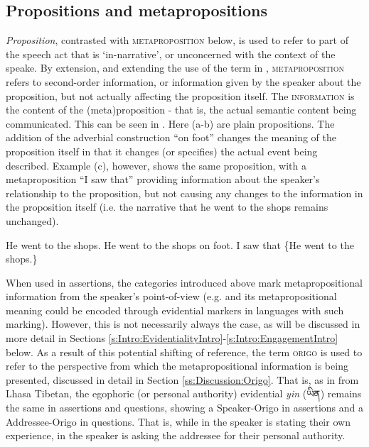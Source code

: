 \subsection{Propositions and metapropositions}
\textit{Proposition}, contrasted with \textsc{metaproposition} below, is used to refer to part of the speech act that is `in-narrative', or unconcerned with the context of the speake. By extension, and extending the use of the term in , \textsc{metaproposition} refers to second-order information, or information given by the speaker about the proposition, but not actually affecting the proposition itself. The \textsc{information} is the content of the (meta)proposition - that is, the actual semantic content being communicated. This can be seen in . Here (a-b) are plain propositions. The addition of the adverbial construction ``on foot'' changes the meaning of the proposition itself in that it changes (or specifies) the actual event being described. Example (c), however, shows the same proposition, with a metaproposition ``I saw that'' providing information about the speaker's relationship to the proposition, but not causing any changes to the information in the proposition itself (i.e. the narrative that he went to the shops remains unchanged).

\begin{exe}
\ex\label{ex:MetapropEnglish}
\begin{xlist}
\ex He went to the shops.
\ex He went to the shops on foot.
\ex I saw that \{He went to the shops.\}\label{ex:MetapropEnglish:c}
\end{xlist}
\end{exe}

When used in assertions, the categories introduced above mark metapropositional information from the speaker's point-of-view (e.g.  and its metapropositional meaning could be encoded through evidential markers in languages with such marking). However, this is not necessarily always the case, as will be discussed in more detail in Sections \ref{s:Intro:EvidentialityIntro}-\ref{s:Intro:EngagementIntro} below. As a result of this potential shifting of reference, the term \textsc{origo} is used to refer to the perspective from which the metapropositional information is being presented, discussed in detail in Section \ref{ss:Discussion:Origo}. That is, as in  from Lhasa Tibetan, the egophoric (or personal authority) evidential \textit{yin} (\foreignlanguage{tibetan}{ཡིན}) remains the same in assertions and questions, showing a Speaker-Origo in assertions and a Addressee-Origo in questions. That is, while in  the speaker is stating their own experience, in  the speaker is asking the addressee for their personal authority.

